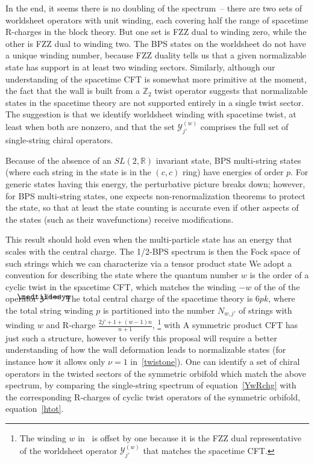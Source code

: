 \documentclass[12pt]{article}
\def\sltwo{\ensuremath{SL(2,\bR)}}
\newcommand\lowermedtildesym{%
  \text{\smash{\raisebox{-1.2ex}{%
    $\medtildesym$}}}}
\newcommand\medtilde[1]{%
  \mathchoice
    {\accentset{\displaystyle\lowermedtildesym}{#1}}
    {\accentset{\textstyle\lowermedtildesym}{#1}}
    {\accentset{\scriptstyle\lowermedtildesym}{#1}}
    {\accentset{\scriptscriptstyle\lowermedtildesym}{#1}}
}
\newcommand{\bR}{{\mathbb R}}
\newcommand{\bZ}{{\mathbb Z}}
\numberwithin{equation}{section}
\def\cY{\mathcal {Y}} \def\cZ{\mathcal {Z}}
\begin{document}
\begin{appendices}
In the end, it seems there is no doubling of the spectrum~-- there are two sets of worldsheet operators with unit winding, each covering half the range of spacetime R-charges in the block theory.  But one set is FZZ dual to winding zero, while the other is FZZ dual to winding two.  The BPS states on the worldsheet do not have a unique winding number, because FZZ duality tells us that a given normalizable state has support in at least two winding sectors.  Similarly, although our understanding of the spacetime CFT is somewhat more primitive at the moment, the fact that the wall is built from a $\bZ_2$ twist operator suggests that normalizable states in the spacetime theory are not supported entirely in a single twist sector.  The suggestion is that we identify worldsheet winding with spacetime twist, at least when both are nonzero, and that the set $\cY^{(w)}_{j'}$ comprises the full set of single-string chiral operators.

Because of the absence of an $\sltwo$ invariant state, BPS multi-string states (where each string in the state is in the $(c,c)$ ring) have energies of order $p$.  For generic states having this energy, the perturbative picture breaks down; however, for BPS multi-string states, one expects non-renormalization theorems to protect the state, so that at least the state counting is accurate even if other aspects of the states (such as their wavefunctions) receive modifications.

This result should hold even when the multi-particle state has an energy that scales with the central charge.  The 1/2-BPS spectrum is then the Fock space of such strings which we can characterize via a tensor product state 
We adopt a convention for describing the state where the quantum number $w$ is the order of a cyclic twist in the spacetime CFT, which matches the winding $-w$ of the of the operator $\medtilde\cY^{(-w)}$
The total central charge of the spacetime theory is $6pk$, where the total string winding $p$ is partitioned into the number $N_{w,j'}$ of strings with winding $w$ and R-charge $\frac{2j'+1+(w-1)n}{n+1}$,%
\footnote{The winding $w$ in \YwRchg\ is offset by one because it is the FZZ dual representative of the worldsheet operator $\cY^{(w)}_{j'}$ that matches the spacetime CFT.}
with
A symmetric product CFT has just such a structure, however to verify this proposal will require a better understanding of how the wall deformation leads to normalizable states (for instance how it allows only $\nu=1$ in~\eqref{twistone}).  One can identify a set of chiral operators in the twisted sectors of the symmetric orbifold which match the above spectrum, by comparing the single-string spectrum of equation~\eqref{YwRchg} with the corresponding R-charges of cyclic twist operators of the symmetric orbifold, equation~\eqref{htot}.


\end{appendices}
\end{document}
